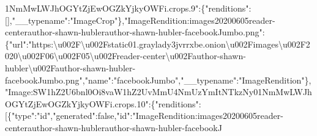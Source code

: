 1NmMwLWJhOGYtZjEwOGZkYjkyOWFi.crops.9":\{"renditions":{[}{]},"\_\_typename":"ImageCrop"\},"ImageRendition:images20200605reader-centerauthor-shawn-hublerauthor-shawn-hubler-facebookJumbo.png":\{"url":"https:\textbackslash{}u002F\textbackslash{}u002Fstatic01.graylady3jvrrxbe.onion\textbackslash{}u002Fimages\textbackslash{}u002F2020\textbackslash{}u002F06\textbackslash{}u002F05\textbackslash{}u002Freader-center\textbackslash{}u002Fauthor-shawn-hubler\textbackslash{}u002Fauthor-shawn-hubler-facebookJumbo.png","name":"facebookJumbo","\_\_typename":"ImageRendition"\},"Image:SW1hZ2U6bnl0Oi8vaW1hZ2UvMmU4NmUzYmItNTkzNy01NmMwLWJhOGYtZjEwOGZkYjkyOWFi.crops.10":\{"renditions":{[}\{"type":"id","generated":false,"id":"ImageRendition:images20200605reader-centerauthor-shawn-hublerauthor-shawn-hubler-facebookJ
